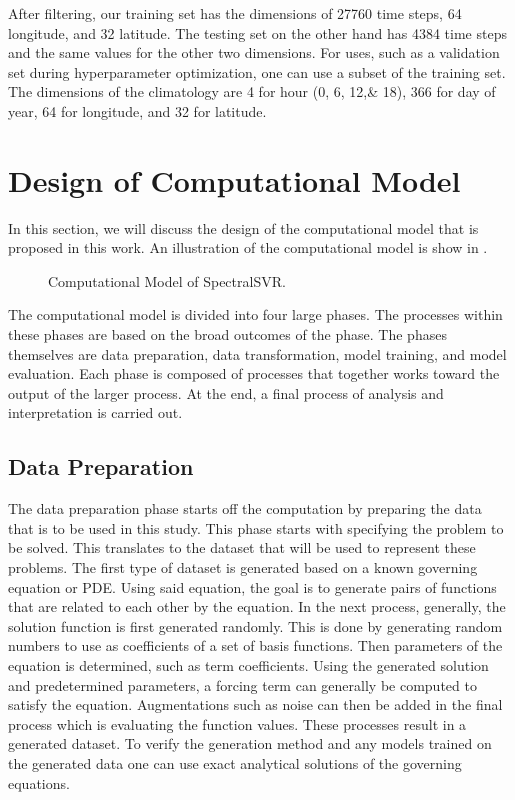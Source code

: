 After filtering, our training set has the dimensions of \num{27760} time steps, \num{64} longitude, and \num{32} latitude. The testing set on the other hand has \num{4384} time steps and the same values for the other two dimensions. For uses, such as a validation set during hyperparameter optimization, one can use a subset of the training set. The dimensions of the climatology are 4 for hour (0, 6, 12,\& 18), \num{366} for day of year, \num{64} for longitude, and 32 for latitude.

\section{Design of Computational Model}\label{sec:computational_model_design}
\noindent In this section, we will discuss the design of the computational model that is proposed in this work. An illustration of the computational model is show in .

\begin{figure}[H]
  \centering
  \begin{adjustbox}{max width=\textwidth}
  \end{adjustbox}
  \caption{Computational Model of SpectralSVR.}\label{fig:computational_model}
\end{figure}

The computational model is divided into four large phases. The processes within these phases are based on the broad outcomes of the phase. The phases themselves are data preparation, data transformation, model training, and model evaluation. Each phase is composed of processes that together works toward the output of the larger process. At the end, a final process of analysis and interpretation is carried out.

\subsection{Data Preparation}
\noindent The data preparation phase starts off the computation by preparing the data that is to be used in this study. This phase starts with specifying the problem to be solved. This translates to the dataset that will be used to represent these problems. The first type of dataset is generated based on a known governing equation or PDE\@. Using said equation, the goal is to generate pairs of functions that are related to each other by the equation. In the next process, generally, the solution function is first generated randomly. This is done by generating random numbers to use as coefficients of a set of basis functions. Then parameters of the equation is determined, such as term coefficients. Using the generated solution and predetermined parameters, a forcing term can generally be computed to satisfy the equation. Augmentations such as noise can then be added in the final process which is evaluating the function values. These processes result in a generated dataset. To verify the generation method and any models trained on the generated data one can use exact analytical solutions of the governing equations.

